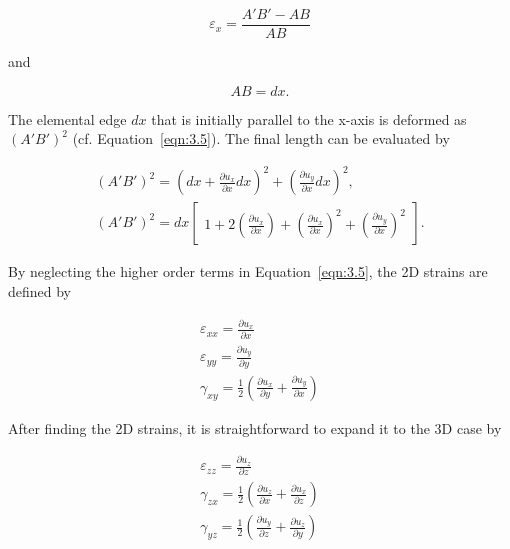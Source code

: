 \begin{equation}
\varepsilon_{x} = \frac{A'B' - AB}{AB}
\end{equation}

\noindent and

\begin{equation}
AB = dx.
\end{equation}

\noindent The elemental edge $dx$ that is initially parallel to the x-axis is deformed as $(A'B')^2$ (cf. Equation~\ref{eqn:3.5}). The final length can be evaluated by


\begin{equation}
\begin{array}{l}
(A'B')^2  = {\left(dx +  \frac{\partial{u_{x}}}{\partial{x}}dx \right)}^2 + {\left(\frac{\partial{u_{y}}}{\partial{x}}dx\right)}^2, \\
(A'B')^2  = dx
\begin{bmatrix}
1 + 2{\left(\frac{\partial{u_{x}}}{\partial{x}} \right)} + {\left(\frac{\partial{u_{x}}}{\partial{x}} \right)}^2 + {\left(\frac{\partial{u_{y}}}{\partial{x}}\right)}^2
 \end{bmatrix}.
\end{array}
\label{eqn:3.5}
\end{equation}

\noindent By neglecting the higher order terms in Equation~\ref{eqn:3.5}, the 2D strains are defined by

\begin{equation}
\begin{array}{l}
\varepsilon_{xx} = \frac{\partial{u_{x}}}{\partial{x}} \\
\varepsilon_{yy} = \frac{\partial{u_{y}}}{\partial{y}} \\
\gamma_{xy} = \frac{1}{2}\left(\frac{\partial{u_{x}}}{\partial{y}} + \frac{\partial{u_{y}}}{\partial{x}}\right)
\end{array}
\end{equation}

\noindent After finding the 2D strains, it is straightforward to expand it to the 3D case by

\begin{equation}
\begin{array}{l}
\varepsilon_{zz} = \frac{\partial{u_{z}}}{\partial{z}} \\
\gamma_{zx} = \frac{1}{2}\left(\frac{\partial{u_{z}}}{\partial{x}} + \frac{\partial{u_{x}}}{\partial{z}}\right) \\
\gamma_{yz} = \frac{1}{2}\left(\frac{\partial{u_{y}}}{\partial{z}} + \frac{\partial{u_{z}}}{\partial{y}}\right)
\end{array}
\end{equation}

